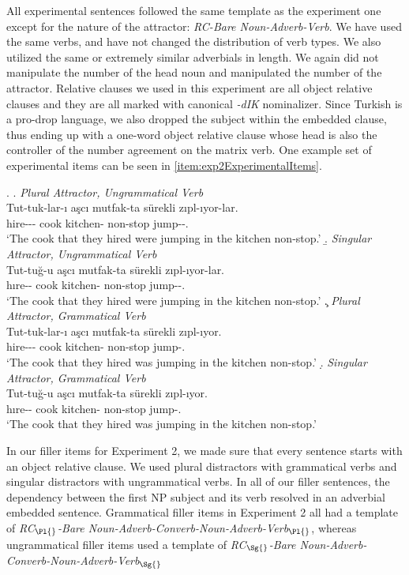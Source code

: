 \documentclass[doc,a4paper,man,natbib,floatsintext,noextraspace]{apa6}\usepackage[]{graphicx}\usepackage[]{color}
\begin{document}
All experimental sentences followed the same template as the experiment one except for the nature of the attractor: \textit{RC-Bare Noun-Adverb-Verb}. 
We have used the same verbs, and have not changed the distribution of verb types. We also utilized the same or extremely similar adverbials in length. We again did not manipulate the number of the head noun and manipulated the number of the attractor. Relative clauses we used in this experiment are all object relative clauses and they are all marked with canonical \textit{-dIK} nominalizer. Since Turkish is a pro-drop language, we also dropped the subject within the embedded clause, thus ending up with a one-word object relative clause whose head is also the controller of the number agreement on the matrix verb. One example set of experimental items can be seen in \ref{item:exp2ExperimentalItems}.


\ex. \label{item:exp2ExperimentalItems}
\a. \textit{Plural Attractor, Ungrammatical Verb}\\ 
\gll *Tut-tuk-lar-ı aşcı mutfak-ta sürekli zıpl-ıyor-lar.\\ 
hire-\Nmlz{}-\Pl{}-\Poss{}  cook kitchen-\Loc{} non-stop  jump-\Prog{}-\Pl{}.\\
\glt `The cook that they hired were jumping in the kitchen non-stop.' 
\b. \textit{Singular Attractor, Ungrammatical Verb}\\ 
\gll *Tut-tuğ-u aşcı mutfak-ta sürekli zıpl-ıyor-lar.\\ 
hıre-\Nmlz{}-\Poss{}  cook kitchen-\Loc{} non-stop  jump-\Prog{}-\Pl{}.\\
\glt `The cook that they hired were jumping in the kitchen non-stop.'
\c. \textit{Plural Attractor, Grammatical Verb}\\ 
\gll Tut-tuk-lar-ı aşcı mutfak-ta sürekli zıpl-ıyor.\\ 
hire-\Nmlz{}-\Pl{}-\Poss{}  cook kitchen-\Loc{} non-stop  jump-\Prog{}.\\
\glt `The cook that they hired was jumping in the kitchen non-stop.'
\d. \textit{Singular Attractor, Grammatical Verb}\\ 
\gll Tut-tuğ-u aşcı mutfak-ta sürekli zıpl-ıyor.\\ 
hıre-\Nmlz{}-\Poss{}  cook kitchen-\Loc{} non-stop  jump-\Prog{}.\\
\glt `The cook that they hired was jumping in the kitchen non-stop.'

In our filler items for Experiment 2, we made sure that every sentence starts with an object relative clause. We used plural distractors with grammatical verbs and singular distractors with ungrammatical verbs. In all of our filler sentences, the dependency between the first NP subject and its verb resolved in an adverbial embedded sentence. Grammatical filler items in Experiment 2 all had a template of \textit{RC$_{\Pl{}}$-Bare Noun-Adverb-Converb-Noun-Adverb-Verb$_{\Pl{}}$}, whereas ungrammatical filler items used a template of \textit{RC$_{\Sg{}}$-Bare Noun-Adverb-Converb-Noun-Adverb-Verb$_{\Sg{}}$}
\end{document}
